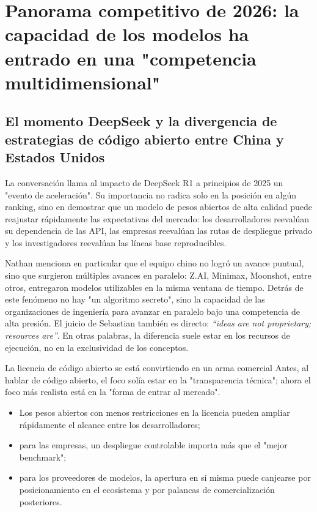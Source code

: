 \section{Panorama competitivo de 2026: la capacidad de los modelos ha entrado en una "competencia multidimensional"}

\subsection{El momento DeepSeek y la divergencia de estrategias de código abierto entre China y Estados Unidos}

La conversación llama al impacto de DeepSeek R1 a principios de 2025 un "evento de aceleración". Su importancia no radica solo en la posición en algún ranking, sino en demostrar que un modelo de pesos abiertos de alta calidad puede reajustar rápidamente las expectativas del mercado: los desarrolladores reevalúan su dependencia de las API, las empresas reevalúan las rutas de despliegue privado y los investigadores reevalúan las líneas base reproducibles.

Nathan menciona en particular que el equipo chino no logró un avance puntual, sino que surgieron múltiples avances en paralelo: Z.AI, Minimax, Moonshot, entre otros, entregaron modelos utilizables en la misma ventana de tiempo. Detrás de este fenómeno no hay "un algoritmo secreto", sino la capacidad de las organizaciones de ingeniería para avanzar en paralelo bajo una competencia de alta presión. El juicio de Sebastian también es directo: \textit{``ideas are not proprietary; resources are''}. En otras palabras, la diferencia suele estar en los recursos de ejecución, no en la exclusividad de los conceptos.

\begin{importantbox}{La licencia de código abierto se está convirtiendo en un arma comercial}
Antes, al hablar de código abierto, el foco solía estar en la "transparencia técnica"; ahora el foco más realista está en la "forma de entrar al mercado".
\begin{itemize}[leftmargin=1.5em]
    \item Los pesos abiertos con menos restricciones en la licencia pueden ampliar rápidamente el alcance entre los desarrolladores;
    \item para las empresas, un despliegue controlable importa más que el "mejor benchmark";
    \item para los proveedores de modelos, la apertura en sí misma puede canjearse por posicionamiento en el ecosistema y por palancas de comercialización posteriores.
\end{itemize}
\end{importantbox}


